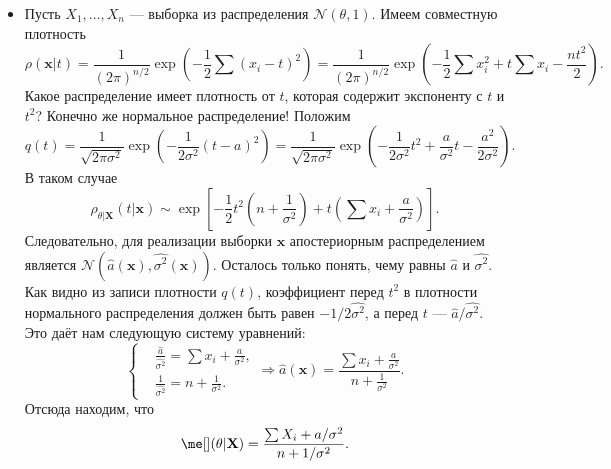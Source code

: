 \begin{example}
\begin{itemize}
\item Пусть $X_1, \ldots, X_n$ --- выборка из распределения $\mathcal{N}(\theta, 1)$. Имеем совместную плотность
$$\rho(\mathbf{x} | t) = \frac{1}{(2\pi)^{n/2}} \exp{\left(-\frac{1}{2} \sum (x_i - t)^2\right)} = \frac{1}{(2\pi)^{n/2}} \exp{\left(-\frac{1}{2} \sum x_i^2 + t\sum x_i - \frac{nt^2}{2}\right)}.$$
Какое распределение имеет плотность от $t$, которая содержит экспоненту с $t$ и $t^2$? Конечно же нормальное распределение! Положим
\[
q(t) = \frac{1}{\sqrt{2\pi\sigma^2}} \exp{\left(-\frac{1}{2\sigma^2} (t - a)^2\right)} = \frac{1}{\sqrt{2\pi\sigma^2}} \exp{\left(-\frac{1}{2\sigma^2} t^2 + \frac{a}{\sigma^2}t - \frac{a^2}{2\sigma^2}\right)}.
\]
В таком случае
\[
\rho_{\theta|\mathbf X}(t|\mathbf{x}) \sim \exp{\left[-\frac{1}{2}t^2\left(n+\frac{1}{\sigma^2}\right) + t\left(\sum x_i + \frac{a}{\sigma^2}\right)\right]}.
\]
Следовательно, для реализации выборки $\mathbf x$ апостериорным распределением является $\mathcal{N}\left(\widehat{a}(\mathbf x), \widehat{\sigma^2}(\mathbf x)\right)$. Осталось только понять, чему равны $\widehat{a}$ и $\widehat{\sigma^2}$. Как видно из записи плотности $q(t)$, коэффициент перед $t^2$ в плотности нормального распределения должен быть равен $-1/2\widehat{\sigma^2}$, а перед $t$ ---  $\widehat{a} / \widehat{\sigma^2}$. Это даёт нам следующую систему уравнений:
\[
\left\{
\begin{aligned}
&\frac{\widehat{a}}{\widehat{\sigma^2}} = \sum x_i + \frac{a}{\sigma^2},\\
&\frac{1}{\widehat{\sigma^2}} = n + \frac{1}{\sigma^2}.
\end{aligned}
\right.
\Longrightarrow
\widehat{a}(\mathbf x) = \frac{\sum x_i + \frac{a}{\sigma^2}}{n + \frac{1}{\sigma^2}}.
\]
Отсюда находим, что
\[
\me[](\theta|\mathbf X) = \frac{\sum X_i + a/\sigma^2}{n + 1/\sigma^2}.
\]


\end{itemize}
\end{example}
